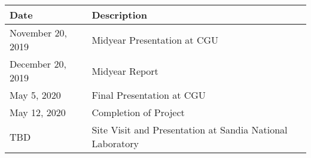 \begin{tabular}{ l|l } 
 \hline
 Date & Description  \\
 \hline
 November 20, 2019 & Midyear Presentation at CGU   \\ 
 December 20, 2019 & Midyear Report \\ 
 May 5, 2020 & Final Presentation at CGU \\ 
 May 12, 2020 & Completion of Project \\ 
 TBD & Site Visit and Presentation at Sandia National Laboratory  \\ 
\end{tabular}\\